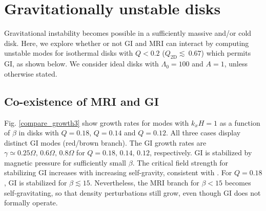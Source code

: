 \section{Gravitationally unstable disks} \label{result2}
Gravitational instability becomes possible in a sufficiently
massive and/or cold disk. Here, we explore whether or not GI and MRI
can interact by computing unstable modes for isothermal disks with $Q < 0.2 $
($Q_\mathrm{2D}\lesssim ~0.67$) which permits GI, as shown below.
We consider ideal disks with $\Lambda_0=100$ and $A=1$, unless
otherwise stated.  

\subsection{Co-existence of MRI and GI} 
Fig. \ref{compare_growth3} show growth rates for modes with $k_xH=1$
as a function of $\beta$ in disks with $Q=0.18$, $Q=0.14$ and
$Q=0.12$.   
All three cases display distinct GI modes (red/brown branch). The GI 
growth rates are $\gamma\simeq 0.25\Omega,\,0.6\Omega,\,0.8\Omega$ for
$Q=0.18,\,0.14,\,0.12$, respectively. GI is stabilized by magnetic
pressure for sufficiently small $\beta$. The critical
field strength for stabilizing GI increases with increasing
self-gravity, consistent with \cite{nakamura83}.   
For $Q=0.18$, GI is stabilized for $\beta \lesssim 15$. Nevertheless, 
the MRI branch for $\beta < 15$ becomes self-gravitating, so that
density perturbations still grow, even though GI does not
formally operate.  


